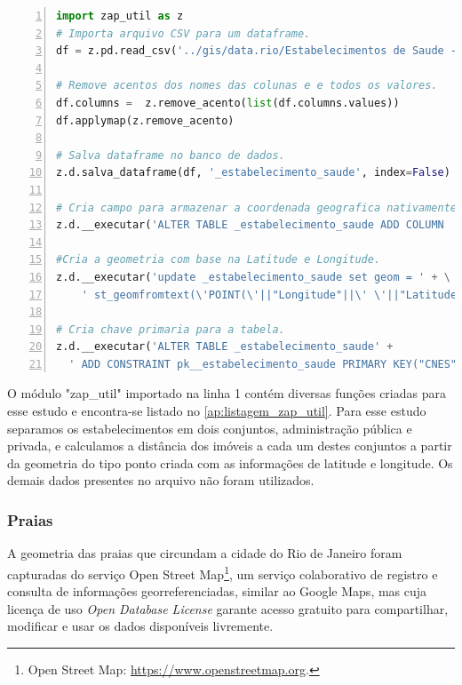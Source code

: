\begin{lstlisting}[language=Python, numbers=left]
import zap_util as z
# Importa arquivo CSV para um dataframe.
df = z.pd.read_csv('../gis/data.rio/Estabelecimentos de Saude - Dados.csv',  encoding='iso-8859-1',  dtype=str)

# Remove acentos dos nomes das colunas e e todos os valores.
df.columns =  z.remove_acento(list(df.columns.values))
df.applymap(z.remove_acento)

# Salva dataframe no banco de dados.
z.d.salva_dataframe(df, '_estabelecimento_saude', index=False)

# Cria campo para armazenar a coordenada geografica nativamente. 
z.d.__executar('ALTER TABLE _estabelecimento_saude ADD COLUMN  geom geometry(Point,4326);')

#Cria a geometria com base na Latitude e Longitude.
z.d.__executar('update _estabelecimento_saude set geom = ' + \
    ' st_geomfromtext(\'POINT(\'||"Longitude"||\' \'||"Latitude"||\')\', 4326)')

# Cria chave primaria para a tabela.
z.d.__executar('ALTER TABLE _estabelecimento_saude' + 
  ' ADD CONSTRAINT pk__estabelecimento_saude PRIMARY KEY("CNES");' )
\end{lstlisting}

O módulo "zap\_util" importado na linha 1 contém diversas funções criadas para esse estudo e encontra-se listado no \cref{ap:listagem_zap_util}. Para esse estudo separamos os estabelecimentos em dois conjuntos, administração pública e privada, e calculamos a distância dos imóveis a cada um destes conjuntos a partir da geometria do tipo ponto criada com as informações de latitude e longitude. Os demais dados  presentes no arquivo não foram utilizados.

\subsubsection{Praias}

A geometria das praias que circundam a cidade do Rio de Janeiro foram capturadas do serviço Open Street Map\footnote{Open Street Map: \url{https://www.openstreetmap.org}.}, um serviço colaborativo de registro e consulta de informações georreferenciadas, similar ao Google Maps, mas cuja licença de uso \textit{Open Database License} garante acesso gratuito para compartilhar, modificar e usar os dados disponíveis livremente. 

